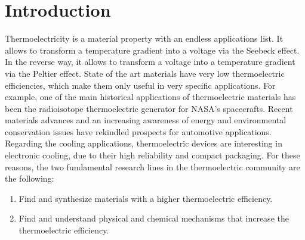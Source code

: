 
\chapter*{Introduction} %

\label{Chapter0} %


Thermoelectricity is a material property with an endless applications list. It allows to transform 
a temperature gradient into a voltage via the Seebeck effect\cite{li2009thermoelectric,yang2006thermoelectric}. In 
the reverse way, it allows to transform a voltage into a temperature gradient via the Peltier 
effect\cite{disalvo1999thermoelectric,zhao2014review}. State of the art materials have very low thermoelectric 
efficiencies, which make them only useful in very specific applications. For example, one of the main  
historical applications of thermoelectric materials has been the radioisotope thermoelectric generator 
for NASA's spacecrafts\cite{yang2006thermoelectric}. Recent materials advances and an increasing awareness of energy 
and environmental conservation issues have rekindled prospects for automotive applications. Regarding the cooling 
applications, thermoelectric devices are interesting in electronic cooling, due to their high reliability and 
compact packaging\cite{zhao2014review}. For these reasons, the two fundamental research lines in the thermoelectric 
community are the following: 
\begin{enumerate}
\item Find and synthesize materials with a higher thermoelectric efficiency.
\item Find and understand physical and chemical mechanisms that increase the thermoelectric efficiency. \\
\end{enumerate}

